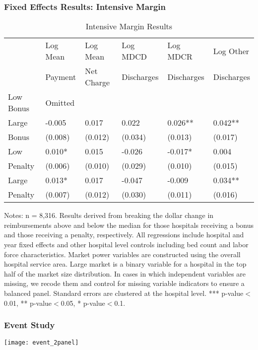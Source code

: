 \documentclass{beamer}
\begin{document}
\begin{frame}
\frametitle{Fixed Effects Results: Intensive Margin}
\begin{table}[htp]
\centering \normalsize
\caption{Intensive Margin Results}
\label{tab:samplemort}
\footnotesize
\begin{tabular}{llllll}
\hline \hline	
 			& Log Mean		& Log Mean		& Log MDCD 	   	& Log MDCR   		& Log Other  			\\
			& Payment		& Net Charge	& Discharges      	& Discharges       		& Discharges        	\\
\hline
Low Bonus & Omitted & & & & \\
Large 	&	-0.005 & 0.017 & 0.022 & 0.026** & 0.042**\\
\hspace{3mm}Bonus			&	(0.008) & (0.012) & (0.034) & (0.013) & (0.017)\\
Low 	&	0.010* & 0.015 & -0.026 & -0.017* & 0.004\\
\hspace{3mm}Penalty			&	(0.006) & (0.010) & (0.029) & (0.010) & (0.015)\\
Large  &	0.013* & 0.017 & -0.047 & -0.009 & 0.034**\\
\hspace{3mm}Penalty			&	(0.007) & (0.012) & (0.030) & (0.011) & (0.016)\\
\hline
\end{tabular}
\end{table}
\tiny Notes: n = 8,316. Results derived from breaking the dollar change in reimbursements above and below the median for those hospitals receiving a bonus and those receiving a penalty, respectively. All regressions include hospital and year ﬁxed eﬀects and other hospital level controls including bed count and labor force characteristics. Market power variables are constructed using the overall hospital service area. Large market is a binary variable for a hospital in the top half of the market size distribution. In cases in which independent variables are missing, we recode them and control for missing variable indicators to ensure a balanced panel. Standard errors are clustered at the hospital level.   *** p-value$<$0.01, ** p-value$<$0.05, * p-value$<$0.1.
\end{frame}

\begin{frame}
\frametitle{Event Study}
\begin{center}
\texttt{[image: event\_2panel]}
\end{center}
\end{frame}
\end{document}

